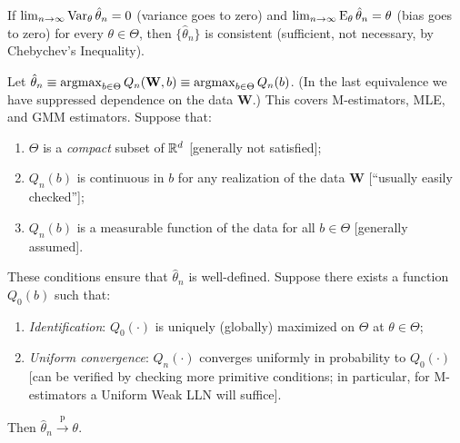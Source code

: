 \documentclass[8pt,letterpaper, landscape]{extarticle} %
\begin{document}
\begin{multicols}{3}
\begin{description}
If $ \lim_{n \to \infty} \operatorname{Var}_\theta \hat{\theta}_n = 0 $ (variance goes to zero) and $ \lim_{n \to \infty} \operatorname{E}_\theta \hat{\theta}_n = \theta $ (bias goes to zero) for every $ \theta \in \Theta $, then $ \{ \hat{\theta}_n \} $ is consistent (sufficient, not necessary, by Chebychev's Inequality).

 Let $ \hat{\theta}_n \equiv \operatorname*{argmax}_{b \in \Theta} Q_n (\mathbf{W}, b) \equiv \operatorname*{argmax}_{b \in \Theta} Q_n (b) $. (In the last equivalence we have suppressed dependence on the data $ \mathbf{W} $.) This covers M-estimators, MLE, and GMM estimators. Suppose that:
\begin{enumerate}
\item $ \Theta $ is a \textit{compact} subset of $ \mathbb{R}^d $ [generally not satisfied];
\item $ Q_n (b) $ is continuous in $ b $ for any realization of the data $ \mathbf{W} $ [``usually easily checked''];
\item $ Q_n (b) $ is a measurable function of the data for all $ b \in \Theta $ [generally assumed].
\end{enumerate}
These conditions ensure that $ \hat{\theta}_n $ is well-defined. Suppose there exists a function $ Q_0 (b) $ such that:
\begin{enumerate}
\item \textit{Identification}: $ Q_0 (\cdot) $ is uniquely (globally) maximized on $ \Theta $ at $ \theta \in \Theta $;
\item \textit{Uniform convergence}: $ Q_n (\cdot) $ converges uniformly in probability to $ Q_0 (\cdot) $ [can be verified by checking more primitive conditions; in particular, for M-estimators a Uniform Weak LLN will suffice].
\end{enumerate}
Then $ \hat{\theta}_n \xrightarrow{\text{p}} \theta $.


\end{description}
\end{multicols}
\end{document}
